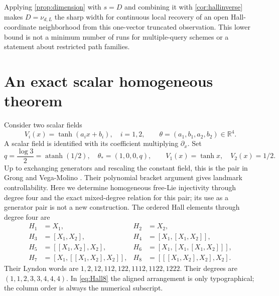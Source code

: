 \documentclass[11pt,a4paper]{article}
\numberwithin{equation}{section}
\theoremstyle{definition}
\theoremstyle{remark}
\DeclareMathOperator{\atanh}{atanh}
\newcommand{\R}{\mathbb R}
\begin{document}
Applying \cref{prop:dimension} with $s=D$ and combining it with
\cref{cor:hallinverse} makes $D=\nu_{d,L}$ the sharp width for
continuous local recovery of an open Hall-coordinate neighborhood from
this one-vector truncated observation. This lower bound is not a
minimum number of runs for multiple-query schemes or a statement about
restricted path families.

\section{An exact scalar homogeneous theorem}
\label{sec:scalar}
Consider two scalar fields
\begin{equation}\label{eq:scalar}
 V_i(x)=\tanh(a_ix+b_i),\quad i=1,2,\qquad
 \theta=(a_1,b_1,a_2,b_2)\in\R^4.
\end{equation}
A scalar field is identified with its coefficient multiplying $\partial_x$.
Set
\begin{equation}\label{eq:witness}
 q=\frac{\log3}{2}=\atanh(1/2),\quad
 \theta_*=(1,0,0,q),\qquad V_1(x)=\tanh x,\quad V_2(x)=1/2.
\end{equation}
Up to exchanging generators and rescaling the constant field, this is
the pair in Grong and Vega-Molino \cite[Remark 3.2]{GrongVegaMolino}.
Their polynomial bracket argument gives landmark controllability.
Here we determine homogeneous free-Lie injectivity through degree four
and the exact mixed-degree relation for this pair; its use as a generator
pair is not a new construction.
The ordered Hall elements through degree four are
\begin{align}\label{eq:Hall8}
 H_1&=X_1,& H_2&=X_2,\nonumber\\
 H_3&=[X_1,X_2],&H_4&=[X_1,[X_1,X_2]],\nonumber\\
 H_5&=[[X_1,X_2],X_2],&H_6&=[X_1,[X_1,[X_1,X_2]]],\nonumber\\
 H_7&=[X_1,[[X_1,X_2],X_2]],&H_8&=[[[X_1,X_2],X_2],X_2].
\end{align}
Their Lyndon words are $1,2,12,112,122,1112,1122,1222$.
Their degrees are $(1,1,2,3,3,4,4,4)$. In \eqref{eq:Hall8} the aligned arrangement is
only typographical; the column order is always the numerical subscript.
\end{document}
